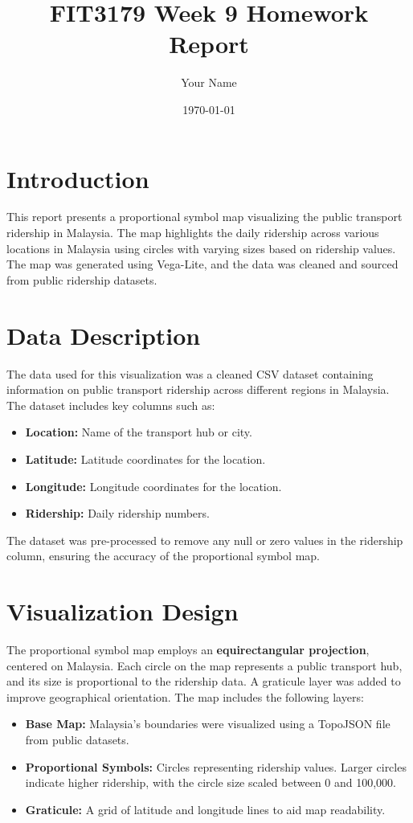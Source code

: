 \documentclass{article}
\title{FIT3179 Week 9 Homework Report}
\author{Your Name}
\date{\today}
\begin{document}
\maketitle

\section*{Introduction}
This report presents a proportional symbol map visualizing the public transport ridership in Malaysia. The map highlights the daily ridership across various locations in Malaysia using circles with varying sizes based on ridership values. The map was generated using Vega-Lite, and the data was cleaned and sourced from public ridership datasets.

\section*{Data Description}
The data used for this visualization was a cleaned CSV dataset containing information on public transport ridership across different regions in Malaysia. The dataset includes key columns such as:
\begin{itemize}
    \item \textbf{Location:} Name of the transport hub or city.
    \item \textbf{Latitude:} Latitude coordinates for the location.
    \item \textbf{Longitude:} Longitude coordinates for the location.
    \item \textbf{Ridership:} Daily ridership numbers.
\end{itemize}

The dataset was pre-processed to remove any null or zero values in the ridership column, ensuring the accuracy of the proportional symbol map.

\section*{Visualization Design}
The proportional symbol map employs an \textbf{equirectangular projection}, centered on Malaysia. Each circle on the map represents a public transport hub, and its size is proportional to the ridership data. A graticule layer was added to improve geographical orientation. The map includes the following layers:
\begin{itemize}
    \item \textbf{Base Map:} Malaysia’s boundaries were visualized using a TopoJSON file from public datasets.
    \item \textbf{Proportional Symbols:} Circles representing ridership values. Larger circles indicate higher ridership, with the circle size scaled between 0 and 100,000.
    \item \textbf{Graticule:} A grid of latitude and longitude lines to aid map readability.
\end{itemize}
\end{document}
